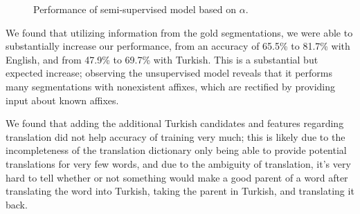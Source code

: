 \documentclass[11pt,twocolumn]{article}
\begin{document}
\begin{figure}
    \label{fig:supervised}
    \caption{Performance of semi-supervised model based on $\alpha$.}
\end{figure}

We found that utilizing information from the gold segmentations, we were able to substantially increase our
performance, from an accuracy of 65.5\% to 81.7\% with English, and from 47.9\% to 69.7\% with Turkish.
This is a substantial but expected increase; observing the unsupervised model reveals that it performs
many segmentations with nonexistent affixes, which are rectified by providing input about known affixes.

We found that adding the additional Turkish candidates and features regarding translation
did not help accuracy of training very much; this is likely due to the incompleteness of the translation
dictionary only being able to provide potential translations for very few words, and due to the ambiguity
of translation, it's very hard to tell whether or not something would make a good parent of a word after
translating the word into Turkish, taking the parent in Turkish, and translating it back.


\end{document}

